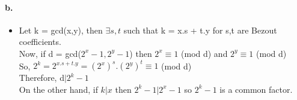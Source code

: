 \documentclass[11pt]{article}
\begin{document}
\paragraph{b.}
\begin{itemize}
    \item Let k = gcd(x,y), then $\exists s,t$ such that k = x.s + t.y for s,t are Bezout coefficients. \\
    Now, if d = gcd($2^x - 1,2^y -1$) then $2^x \equiv 1$ (mod d) and $2^y \equiv 1$ (mod d) \\
    So, $2^k = 2^{x.s + t.y} = (2^x)^s.(2^y)^t \equiv 1$ (mod d) \\
    Therefore, d$| 2^k-1$ \\
    On the other hand, if $k|x$ then $2^k -1 | 2^x -1 $ so $2^k -1$ is a common factor.
\end{itemize}
\end{document}

